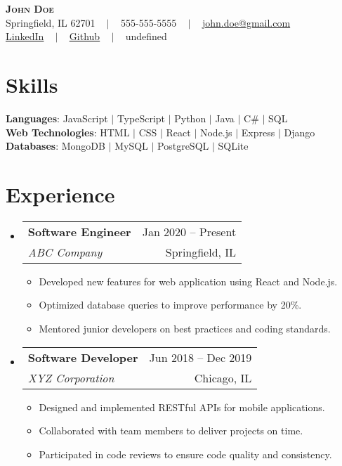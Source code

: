 \documentclass[letterpaper,11pt]{article}
\makeatletter
\newcommand{\resumeItem}[1]{
  \item\small{
    {#1 \vspace{-2pt}}
  }
}
\newcommand{\resumeSubheading}[4]{
  \vspace{0pt}\item
    \begin{tabular*}{0.97\textwidth}[t]{l@{\extracolsep{\fill}}r}
      \textbf{#1} & #2 \vspace{-2pt} \\
      \small\textit{#3} & \small{#4}
    \end{tabular*}\vspace{-7pt}
}
\newcommand{\resumeSubHeadingListStart}{\begin{itemize}[leftmargin=0.15in, label={}]}
\newcommand{\resumeSubHeadingListEnd}{\end{itemize}}
\newcommand{\resumeItemListStart}{\begin{itemize}}
\newcommand{\resumeItemListEnd}{\end{itemize}\vspace{-5pt}}
\makeatother
\begin{document}
\begin{center}
  \textbf{\Huge \scshape John Doe} \\ \vspace{8pt}
  \small Springfield, IL 62701 ~ $|$ ~ 
\small 555-555-5555 ~ $|$ ~ 
\href{mailto:john.doe@gmail.com}{\color{black}john.doe@gmail.com} \\ 
\vspace{2pt}\href{https://www.linkedin.com/in/johndoe}{\underline{LinkedIn}} ~ $|$ ~ 
\href{https://github.com/johndoe}{\underline{Github}} ~ $|$ ~ 
\small undefined
\end{center}

\section{Skills}
  \begin{itemize}[leftmargin=0.15in, label={}]
    \small{\item{
      \textbf{Languages}{: JavaScript $|$ TypeScript $|$ Python $|$ Java $|$ C\# $|$ SQL} \\ 
			\textbf{Web Technologies}{: HTML $|$ CSS $|$ React $|$ Node.js $|$ Express $|$ Django} \\ 
			\textbf{Databases}{: MongoDB $|$ MySQL $|$ PostgreSQL $|$ SQLite}
    }}
  \end{itemize}

\section{Experience}
  \resumeSubHeadingListStart
    \resumeSubheading
      {Software Engineer}{Jan 2020 -- Present}
      {ABC Company}{Springfield, IL}
    \resumeItemListStart
      \resumeItem{Developed new features for web application using React and Node.js.}
			\resumeItem{Optimized database queries to improve performance by 20\%.}
			\resumeItem{Mentored junior developers on best practices and coding standards.}
    \resumeItemListEnd
		\resumeSubheading
      {Software Developer}{Jun 2018 -- Dec 2019}
      {XYZ Corporation}{Chicago, IL}
    \resumeItemListStart
      \resumeItem{Designed and implemented RESTful APIs for mobile applications.}
			\resumeItem{Collaborated with team members to deliver projects on time.}
			\resumeItem{Participated in code reviews to ensure code quality and consistency.}
    \resumeItemListEnd
  \resumeSubHeadingListEnd
\end{document}

